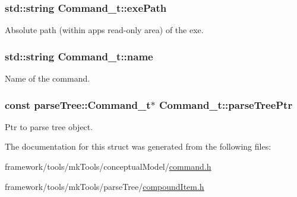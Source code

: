 \subsubsection[{\texorpdfstring{exe\+Path}{exePath}}]{\setlength{\rightskip}{0pt plus 5cm}std\+::string Command\+\_\+t\+::exe\+Path}\hypertarget{struct_command__t_ae11a7f73f62be79600146a670d22f064}{}\label{struct_command__t_ae11a7f73f62be79600146a670d22f064}


Absolute path (within app\textquotesingle{}s read-\/only area) of the exe. 

\subsubsection[{\texorpdfstring{name}{name}}]{\setlength{\rightskip}{0pt plus 5cm}std\+::string Command\+\_\+t\+::name}\hypertarget{struct_command__t_a57ebbc551ac7a91994f2fa4e6bae1c23}{}\label{struct_command__t_a57ebbc551ac7a91994f2fa4e6bae1c23}


Name of the command. 

\subsubsection[{\texorpdfstring{parse\+Tree\+Ptr}{parseTreePtr}}]{\setlength{\rightskip}{0pt plus 5cm}const {\bf parse\+Tree\+::\+Command\+\_\+t}$\ast$ Command\+\_\+t\+::parse\+Tree\+Ptr}\hypertarget{struct_command__t_a624ae1e76751f5f4eaf2d7a9a0ba1e76}{}\label{struct_command__t_a624ae1e76751f5f4eaf2d7a9a0ba1e76}


Ptr to parse tree object. 



The documentation for this struct was generated from the following files\+:\begin{DoxyCompactItemize}
\item 
framework/tools/mk\+Tools/conceptual\+Model/\hyperlink{command_8h}{command.\+h}\item 
framework/tools/mk\+Tools/parse\+Tree/\hyperlink{compound_item_8h}{compound\+Item.\+h}\end{DoxyCompactItemize}
